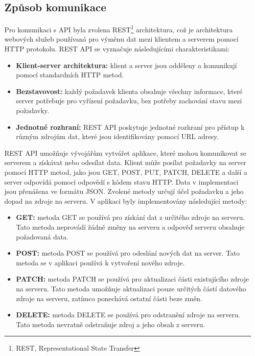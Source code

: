 \subsection{Způsob komunikace}

Pro komunikaci s API byla zvolena REST\footnote{REST, Representational State Transfer} architektura, což je architektura webových služeb používaná pro výměnu dat mezi klientem a serverem pomocí HTTP protokolu. REST API se vyznačuje následujícími charakteristikami:

\begin{itemize}
  \item \textbf{Klient-server architektura:} klient a server jsou odděleny a komunikují pomocí standardních HTTP metod.
  \item \textbf{Bezstavovost:} každý požadavek klienta obsahuje všechny informace, které server potřebuje pro vyřízení požadavku, bez potřeby zachování stavu mezi požadavky.
  \item \textbf{Jednotné rozhraní:} REST API poskytuje jednotné rozhraní pro přístup k různým zdrojům dat, které jsou identifikovány pomocí URL adresy.
\end{itemize}

REST API umožňuje vývojářům vytvářet aplikace, které mohou komunikovat se serverem a získávat nebo odesílat data.
Klient může posílat požadavky na server pomocí HTTP metod, jako jsou GET, POST, PUT, PATCH, DELETE a další
a server odpovídá pomocí odpovědí s kódem stavu HTTP. Data v implementaci jsou přenášena ve formátu JSON. Zvolené metody
určují účel požadavku a jeho dopad na zdroje na serveru. V aplikaci byly implementovány následující metody:

\begin{itemize}
  \item \textbf{GET:} metoda GET se používá pro získání dat z určitého zdroje na serveru. Tato metoda neprovádí žádné změny na serveru a odpověď serveru obsahuje požadovaná data.
  \item \textbf{POST:} metoda POST se používá pro odeslání nových dat na server. Tato metoda se v aplikaci používá k vytvoření nového zdroje.
  \item \textbf{PATCH:} metoda PATCH se používá pro aktualizaci části existujícího zdroje na serveru. Tato metoda umožňuje aktualizaci pouze určitých částí datového zdroje na serveru, zatímco ponechává ostatní části beze změn.
  \item \textbf{DELETE:} metoda DELETE se používá pro odstranění zdroje na serveru. Tato metoda nevratně odstraňuje zdroj a jeho obsah z serveru.
\end{itemize}

